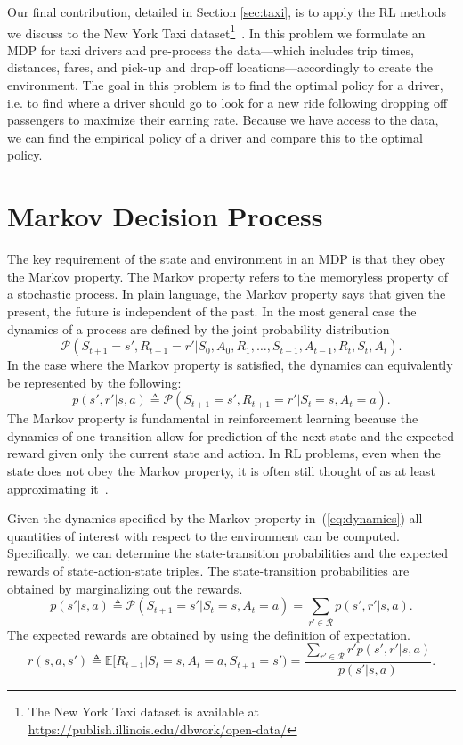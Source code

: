 \documentclass{article}
\newcommand{\mc}{\mathcal}
\newcommand{\mb}{\mathbb}
\begin{document}
Our final contribution, detailed in Section \ref{sec:taxi}, is to apply the RL methods we discuss to the New York Taxi dataset\footnote{The New York Taxi dataset is available at \url{https://publish.illinois.edu/dbwork/open-data/}}~\cite{donovan2014new}. In this problem we formulate an MDP for taxi drivers and pre-process the data---which includes trip times, distances, fares, and pick-up and drop-off locations---accordingly to create the environment. The goal in this problem is to find the optimal policy for a driver, i.e. to find where a driver should go to look for a new ride following dropping off passengers to maximize their earning rate. Because we have access to the data, we can find the empirical policy of a driver and compare this to the optimal policy. 

\section{Markov Decision Process}\label{sec:mdp}
The key requirement of the state and environment in an MDP is that they obey the Markov property. The Markov property refers to the memoryless property of a stochastic process. In plain language, the Markov property says that given the present, the future is independent of the past. In the most general case the dynamics of a process are defined by the joint probability distribution
\begin{equation}
\mc{P}(S_{t+1}=s', R_{t+1}=r'|S_0, A_0, R_1, \dots, S_{t-1}, A_{t-1}, R_t, S_t, A_t).
\end{equation}
In the case where the Markov property is satisfied, the dynamics can equivalently be represented by the following:
\begin{equation}\label{eq:dynamics}
p(s', r'|s, a) \triangleq \mc{P}(S_{t+1}=s', R_{t+1}=r'|S_t=s, A_t=a).
\end{equation}
The Markov property is fundamental in reinforcement learning because the dynamics of one transition allow for prediction of the next state and the expected reward given only the current state and action. In RL problems, even when the state does not obey the Markov property, it is often still thought of as at least approximating it~\cite{sutton1998reinforcement}.

Given the dynamics specified by the Markov property in~(\ref{eq:dynamics}) all quantities of interest with respect to the environment can be computed. Specifically, we can determine the state-transition probabilities and the expected rewards of state-action-state triples. The state-transition probabilities are obtained by marginalizing out the rewards.
\begin{equation}
p(s'|s, a) \triangleq \mc{P}(S_{t+1}=s'|S_t=s, A_t=a) = \sum_{r' \in \mc{R}} p(s', r'|s, a).
\end{equation}
The expected rewards are obtained by using the definition of expectation.
\begin{equation}
r(s,a,s') \triangleq \mb{E}[R_{t+1}|S_t=s, A_t=a, S_{t+1}=s') = \frac{\sum_{r' \in \mc{R}} r'p(s', r'|s, a)}{p(s'|s,a)}.
\end{equation}
\end{document}
